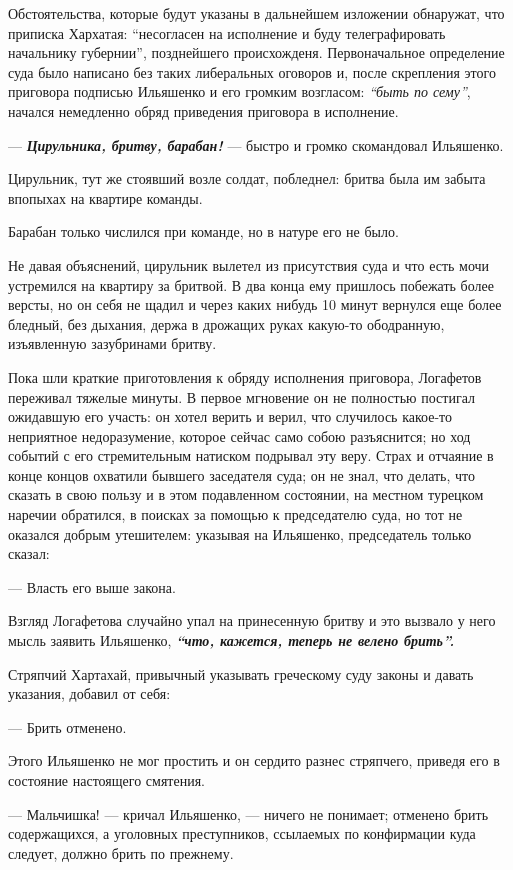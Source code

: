 \documentclass[a4paper,20pt]{report}
\begin{document}
Обстоятельства, которые будут указаны в дальнейшем
изложении обнаружат, что приписка Хархатая: ``несогласен
на исполнение и буду телеграфировать начальнику губернии'',
позднейшего происхожденя. Первоначальное определение суда
было написано без таких либеральных оговоров и, после
скрепления этого приговора подписью Ильяшенко и его громким возгласом: 
\emph{``быть по сему''}, начался немедленно обряд приведения 
приговора в исполнение.

— \textbf{\emph{Цирульника, бритву, барабан!}} — быстро и громко скомандовал Ильяшенко.

Цирульник, тут же стоявший возле солдат, побледнел: бритва была им забыта
впопыхах на квартире команды.

Барабан только числился при команде, но в натуре его не было.

Не давая объяснений, цирульник вылетел из присутствия суда и что есть мочи
устремился на квартиру за бритвой. В два конца ему пришлось побежать более
версты, но он себя не щадил и через каких нибудь 10 минут вернулся еще более
бледный, без дыхания, держа в дрожащих руках какую-то ободранную, изъявленную
зазубринами бритву.

Пока шли краткие приготовления к обряду исполнения приговора, Логафетов
переживал тяжелые минуты. В первое мгновение он не полностью постигал ожидавшую
его участь: он хотел верить и верил, что случилось какое-то неприятное
недоразумение, которое сейчас само собою разъяснится; но ход событий с его
стремительным натиском подрывал эту веру. Страх и отчаяние в конце концов
охватили бывшего заседателя суда; он не знал, что делать, что сказать в свою
пользу и в этом подавленном состоянии, на местном турецком наречии обратился,
в поисках за помощью к председателю суда, но тот не оказался добрым утешителем:
указывая на Ильяшенко, председатель только сказал:

— Власть его выше закона.

Взгляд Логафетова случайно упал на принесенную
бритву и это вызвало у него мысль заявить Ильяшенко,
\textbf{\emph{``что, кажется, теперь не велено брить''.}}

Стряпчий Хартахай, привычный указывать греческому
суду законы и давать указания, добавил от себя:

— Брить отменено.

Этого Ильяшенко не мог простить и он сердито разнес стряпчего, 
приведя его в состояние настоящего смятения.

— Мальчишка! — кричал Ильяшенко, — ничего не понимает; отменено брить содержащихся, 
а уголовных преступников, ссылаемых по конфирмации куда следует,
должно брить по прежнему.
\end{document}
